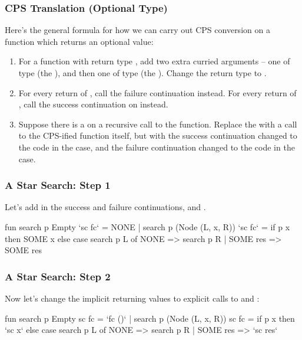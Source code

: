 \documentclass[aspectratio=169]{beamer}
\begin{document}
\begin{frame}[fragile]
  \frametitle{CPS Translation (Optional Type)}

  Here's the general formula for how we can carry out CPS conversion on a function
  which returns an optional value:

  \begin{enumerate}
    \item For a function with return type , add two extra curried 
    arguments -- one of type  (the ), 
    and then one of type  (the ). 
    Change the return type to .
    \item For every return of , call the failure continuation instead.
    For every return of , call the success continuation on 
    instead. 
    \item Suppose there is a  on a recursive call to the function. 
    Replace the  with a call to the CPS-ified function itself, but 
    with the success continuation changed to the code in the  case, 
    and the failure continuation changed to the code in the  case. 
  \end{enumerate}
\end{frame}

\begin{frame}[fragile]
  \frametitle{A Star Search: Step 1}

  Let's add in the success and failure continuations,  and .
  
  \begin{codeblock}
    fun search p Empty `sc fc` = NONE
      | search p (Node (L, x, R)) `sc fc` =
          if p x then
            SOME x 
          else
            case search p L of
              NONE => search p R
            | SOME res => SOME res
  \end{codeblock}
\end{frame}

\begin{frame}[fragile]
  \frametitle{A Star Search: Step 2}

  Now let's change the implicit returning values to explicit calls to
   and : 
  
  \begin{codeblock}
    fun search p Empty sc fc = `fc ()`
      | search p (Node (L, x, R)) sc fc =
          if p x then
            `sc x` 
          else
            case search p L of
              NONE => search p R
            | SOME res => `sc res`
  \end{codeblock}
\end{frame}
\end{document}
